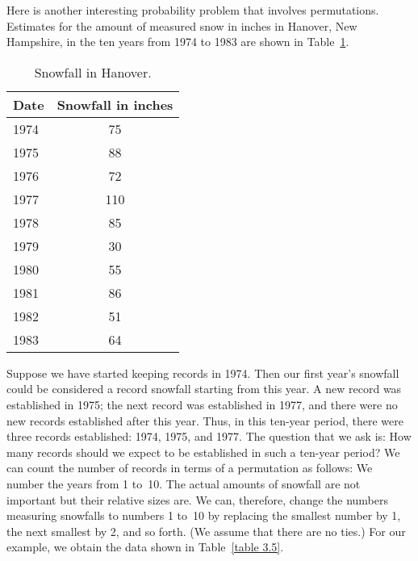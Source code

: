 Here is another interesting probability problem that involves permutations.  Estimates
for the amount of measured snow in inches in Hanover, New Hampshire, in
the ten years from 1974 to 1983 are shown in Table~\ref{table 3.4}.
\begin{table}
\centering
\begin{tabular}{lc} Date & Snowfall in inches \\ \hline
  1974  & \hspace{.1in}75   \\
  1975  & \hspace{.1in}88   \\
  1976  & \hspace{.1in}72   \\
  1977  & \hspace{.031in}110 \\
  1978  & \hspace{.1in}85   \\
  1979  & \hspace{.1in}30   \\
  1980  & \hspace{.1in}55   \\
  1981  & \hspace{.1in}86   \\
  1982  & \hspace{.1in}51   \\
  1983  & \hspace{.1in}64   \\
\end{tabular}
\caption{Snowfall in Hanover.}
\label{table 3.4}
\end{table}
Suppose we have started keeping records in 1974.  Then our first year's snowfall could
be considered a record snowfall starting from this year.  A new record was established
in 1975; the next record was established in 1977, and there were no new records
established after this year.  Thus, in this ten-year period, there were three records
established: 1974, 1975, and 1977.  The question that we ask is: How many records
should we expect to be established in such a ten-year period?  We can count the number
of records in terms of a permutation as follows: We number the years from 1 to~10. 
The actual amounts of snowfall are not important but their relative sizes are. We can,
therefore, change the numbers measuring snowfalls to numbers 1 to~10 by replacing the
smallest number by 1, the next smallest by 2, and so forth.  (We assume that there are
no ties.)  For our example, we obtain the data shown in Table~\ref{table 3.5}.

